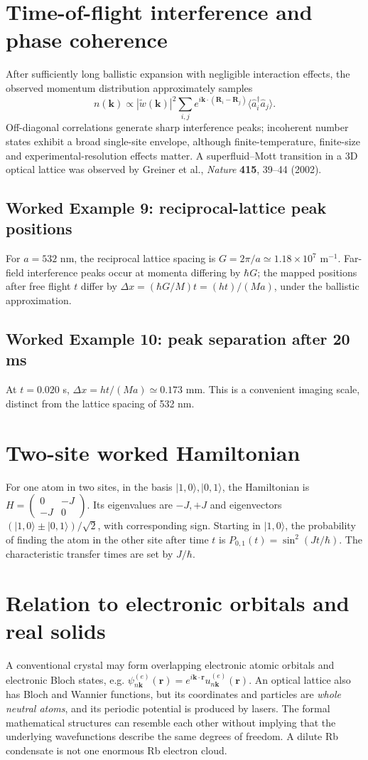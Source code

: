 \documentclass[11pt,a4paper]{article}
\newcommand{\ex}[1]{\subsection*{Worked Example #1}}
\begin{document}
\section{Time-of-flight interference and phase coherence}
After sufficiently long ballistic expansion with negligible interaction effects, the observed momentum distribution approximately samples
\begin{equation}n(\mathbf k)\propto|\widetilde w(\mathbf k)|^2\sum_{i,j}e^{i\mathbf k\cdot(\mathbf R_i-\mathbf R_j)}\langle\hat a_i^\dagger\hat a_j\rangle.\end{equation}
Off-diagonal correlations generate sharp interference peaks; incoherent number states exhibit a broad single-site envelope, although finite-temperature, finite-size and experimental-resolution effects matter. A superfluid--Mott transition in a 3D optical lattice was observed by Greiner et al., \emph{Nature} \textbf{415}, 39--44 (2002).
\ex{9: reciprocal-lattice peak positions} For $a=532$ nm, the reciprocal lattice spacing is $G=2\pi/a\simeq1.18\times10^7$ m$^{-1}$. Far-field interference peaks occur at momenta differing by $\hbar G$; the mapped positions after free flight $t$ differ by $\Delta x=(\hbar G/M)t=(ht)/(Ma)$, under the ballistic approximation.
\ex{10: peak separation after 20 ms} At $t=0.020$ s, $\Delta x=ht/(Ma)\simeq0.173$ mm. This is a convenient imaging scale, distinct from the lattice spacing of 532 nm.
\section{Two-site worked Hamiltonian}
For one atom in two sites, in the basis $|1,0\rangle,|0,1\rangle$, the Hamiltonian is $H=\begin{pmatrix}0&-J\\-J&0\end{pmatrix}$. Its eigenvalues are $-J,+J$ and eigenvectors $(|1,0\rangle\pm|0,1\rangle)/\sqrt2$, with corresponding sign. Starting in $|1,0\rangle$, the probability of finding the atom in the other site after time $t$ is $P_{0,1}(t)=\sin^2(Jt/\hbar)$. The characteristic transfer times are set by $J/\hbar$.
\section{Relation to electronic orbitals and real solids}
A conventional crystal may form overlapping electronic atomic orbitals and electronic Bloch states, e.g. $\psi_{n\mathbf k}^{(e)}(\mathbf r)=e^{i\mathbf k\cdot\mathbf r}u_{n\mathbf k}^{(e)}(\mathbf r)$. An optical lattice also has Bloch and Wannier functions, but its coordinates and particles are \emph{whole neutral atoms}, and its periodic potential is produced by lasers. The formal mathematical structures can resemble each other without implying that the underlying wavefunctions describe the same degrees of freedom. A dilute Rb condensate is not one enormous Rb electron cloud.
\end{document}
